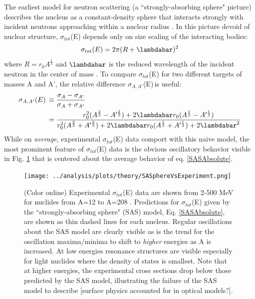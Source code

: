 \documentclass[twocolumn,secnumarabic,amssymb, nobibnotes, aps, prl,
superscriptaddress, nobalancelastpage]{revtex4}
\newcommand{\totEs}{\ensuremath{\sigma_{tot}}(E)\,\,}
\newcommand{\totRDs}{\ensuremath{\sigma_{A,A'}}(E)\,}
\begin{document}
The earliest model for neutron scattering (a ``strongly-absorbing sphere"
picture) describes the nucleus as a constant-density sphere that interacts
strongly with incident neutrons approaching within a nuclear radius
\cite{Feshbach1949}. In this picture devoid of nuclear structure, \totEs depends
only on size scaling of the interacting bodies:
\begin{equation} \label{SASAbsolute}
    \sigma_{tot}(E) = 2\pi(R + \lambdabar)^{2}
\end{equation}
where $R=r_{0}A^{\frac{1}{3}}$ and $\lambdabar$ is the reduced wavelength
of the incident neutron in the center of mass \cite{Fernbach1949, Satchler1980}. 
To compare \totEs for two different targets of masses A and A', the relative
difference \totRDs is useful:
\begin{equation} \label{SASRelDiff}
    \begin{split}
        \totRDs & \equiv
    \frac{\sigma_{A}-\sigma_{A'}}{\sigma_{A}+\sigma_{A'}} \\
    & =
    \frac{r_{0}^{2}(A^{\frac{2}{3}}-A'^{\frac{2}{3}}) +
    2\lambdabar r_{0}(A^{\frac{1}{3}}-A'^{\frac{1}{3}})}
    {r_{0}^{2}(A^{\frac{2}{3}}+A'^{\frac{2}{3}}) +
    2\lambdabar r_{0}(A^{\frac{1}{3}}+A'^{\frac{1}{3}}) + 2\lambdabar^{2}}
    \end{split}
\end{equation}
While on \textit{average}, experimental \totEs data comport with this naive
model, the most prominent feature of \totEs data is the obvious oscillatory
behavior visible in Fig. \ref{SASphereVsExperiment} that is centered about
the average behavior of eq. \ref{SASAbsolute}.

\begin{figure}
    \texttt{[image: ../analysis/plots/theory/SASphereVsExperiment.png]}
    \caption{(Color online) Experimental \totEs data are shown from 2-500
        MeV for nuclides from A=12 to A=208
        \cite{Finlay1993, Schwartz1974, Poenitz1983, Abfalterer2000, Abfalterer2001}.
        Predictions for \totEs given by the ``strongly-absorbing sphere" (SAS)
        model, Eq. \ref{SASAbsolute}, are shown as thin dashed lines for each nucleus.
        Regular oscillations about the SAS model are clearly visible
        as is the trend for the oscillation
        maxima/minima to shift to \textit{higher} energies as A is increased. At low energies 
        resonance structures are visible especially for light nuclides where the
        density of states is smallest. Note that at higher energies, the experimental
        cross sections drop below those predicted by the SAS model, illustrating
    the failure of the SAS model to describe [surface physics accounted for in
optical models?].}
    \label{SASphereVsExperiment}
\end{figure}
\end{document}
